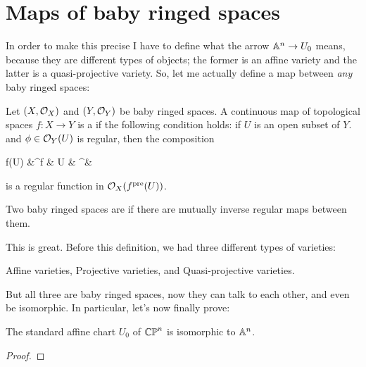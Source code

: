 \documentclass[11pt]{scrreprt}
\begin{document}
\section{Maps of baby ringed spaces}
In order to make this precise I have to define
what the arrow $\mathbb A^n \to U_0$ means,
because they are different types of objects;
the former is an affine variety and the latter is a quasi-projective variety.
So, let me actually define a map between \emph{any} baby ringed spaces:
\begin{definition}
	Let $(X, \mathcal O_X)$ and $(Y, \mathcal O_Y)$
	be baby ringed spaces.
	A continuous map of topological spaces $f: X \to Y$
	is a  if the following condition holds:
	if $U$ is an open subset of $Y$.
	and $\phi \in \mathcal O_Y(U)$ is regular, then the composition
	\begin{diagram}
		f\pre(U) &\rTo^f & U & \rTo^\phi & \CC
	\end{diagram}
	is a regular function in $\mathcal O_X(f^{\text{pre}}(U))$.

	Two baby ringed spaces are 
	if there are mutually inverse regular maps between them.
\end{definition}
This is great.
Before this definition, we had three different types of varieties:
\begin{itemize}
	\ii Affine varieties,
	\ii Projective varieties, and
	\ii Quasi-projective varieties.
\end{itemize}
But all three are baby ringed spaces, now they can
talk to each other, and even be isomorphic.
In particular, let's now finally prove:
\begin{proposition}
	The standard affine chart $U_0$ of $\mathbb{CP}^n$
	is isomorphic to $\mathbb A^n$.
\end{proposition}
\begin{proof}
\end{proof}
\end{document}
